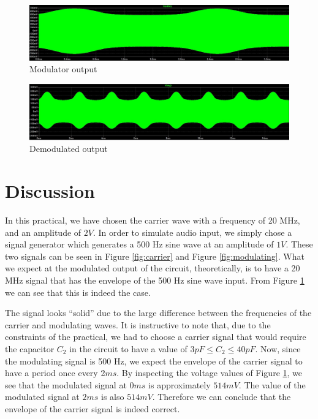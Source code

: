 \documentclass[12pt, a4paper]{article}
\begin{document}
	\begin{figure}[H]
		\centering
		\includegraphics[width=\textwidth]{images/output_modulated.JPG}
		\caption{Modulator output}
		\label{fig:output_modulated}
	\end{figure}

	\begin{figure}[H]
		\centering
		\includegraphics[width=\textwidth]{images/output_demodulated.JPG}
		\caption{Demodulated output}
		\label{fig:output_demodulated}
	\end{figure}

\section{Discussion} %
\label{sec:discussion}
	In this practical, we have chosen the carrier wave with a frequency of 20 MHz, and an amplitude of $2V$. In order to simulate audio input, we simply chose a signal generator which generates a 500 Hz sine wave at an amplitude of $1V$. These two signals can be seen in Figure \ref{fig:carrier} and Figure \ref{fig:modulating}. What we expect at the modulated output of the circuit, theoretically, is to have a 20 MHz signal that has the envelope of the 500 Hz sine wave input. From Figure \ref{fig:output_modulated} we can see that this is indeed the case.

	The signal looks ``solid'' due to the large difference between the frequencies of the carrier and modulating waves. It is instructive to note that, due to the constraints of the practical, we had to choose a carrier signal that would require the capacitor $C_2$ in the circuit to have a value of $3pF \le C_2 \le 40pF$. Now, since the modulating signal is 500 Hz, we expect the envelope of the carrier signal to have a period once every 2$ms$. By inspecting the voltage values of Figure \ref{fig:output_modulated}, we see that the modulated signal at 0$ms$ is approximately $514mV$. The value of the modulated signal at $2ms$ is also $514mV$. Therefore we can conclude that the envelope of the carrier signal is indeed correct.
\end{document}
